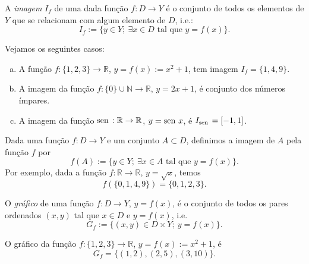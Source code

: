 \begin{defn}
  A \emph{imagem} $I_f$ de uma dada função $f:D\to Y$ é o conjunto de todos os elementos de $Y$ que se relacionam com algum elemento de $D$, i.e.:
  \begin{equation}
    I_f := \{y\in Y;~\exists x\in D\text{ tal que }y=f(x)\}.
  \end{equation}
\end{defn}

\begin{ex}
  Vejamos os seguintes casos:
  \begin{enumerate}[a)]
  \item A função $f:\{1,2,3\}\to\mathbb{R}$, $y = f(x) := x^2 + 1$, tem imagem $I_f = \{1,4,9\}$.
  \item A imagem da função $f:\{0\}\cup\mathbb{N}\to\mathbb{R}$, $y = 2x+1$, é conjunto dos números ímpares.
  \item A imagem da função $\operatorname{sen}\,:\mathbb{R}\to\mathbb{R}$, $y=\operatorname{sen}\, x$, é $I_{\operatorname{sen}\,} = [-1, 1]$.
  \end{enumerate}
\end{ex}

\begin{obs}
  Dada uma função $f:D\to Y$ e um conjunto $A\subset D$, definimos a imagem de $A$ pela função $f$ por
  \begin{equation}
    f(A) := \{y\in Y;~\exists x\in A\text{ tal que }y=f(x)\}.
  \end{equation}
Por exemplo, dada a função $f:\mathbb{R}\to\mathbb{R}$, $y=\sqrt{x}$, temos
\begin{equation}
  f\left(\{0,1,4,9\}\right) = \{0,1,2,3\}.
\end{equation}
\end{obs}

\begin{defn} O \emph{gráfico} de uma função $f:D\to Y$, $y=f(x)$, é o conjunto de todos os pares ordenados $(x,y)$ tal que $x\in D$ e $y=f(x)$, i.e.
\begin{equation}
  G_f := \{(x, y)\in D\times Y;~y=f(x)\}.
\end{equation}
\end{defn}

\begin{ex}
  O gráfico da função $f:\{1,2,3\}\to\mathbb{R}$, $y = f(x) := x^2 + 1$, é
  \begin{equation}
    G_f = \{(1, 2), (2, 5), (3, 10)\}.
  \end{equation}
\end{ex}

